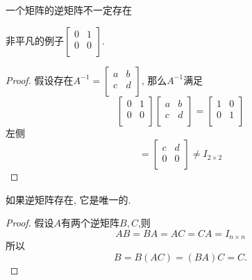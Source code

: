 \begin{proposition}
    一个矩阵的逆矩阵不一定存在
\end{proposition}
\begin{example}
    非平凡的例子$\begin{bmatrix}
     0 & 1\\
     0 & 0\\
    \end{bmatrix}$.
    \begin{proof}
        假设存在$A^{-1} = \begin{bmatrix}
            a & b\\
            c & d\\
           \end{bmatrix}$, 那么$A^{-1}$满足
           \begin{equation}
             \begin{bmatrix}
              0 & 1\\
              0 & 0\\
             \end{bmatrix}
             \begin{bmatrix}
              a & b\\
              c & d\\
             \end{bmatrix}
             =
             \begin{bmatrix}
              1 & 0\\
              0 & 1\\
             \end{bmatrix}
           \end{equation}
           左侧
           \begin{equation}
             = \begin{bmatrix}
              c & d\\
              0 & 0\\
             \end{bmatrix} \neq I_{2\times 2}
           \end{equation}
    \end{proof}
\end{example}

\begin{proposition}
    如果逆矩阵存在, 它是唯一的.
\end{proposition}
\begin{proof}
    假设$A$有两个逆矩阵$B,C$,则
    \begin{equation}
      AB = BA = AC = CA = I_{n \times n}
    \end{equation}
    所以
    \begin{equation}
      B = B(AC) = (BA)C = C.
    \end{equation}
\end{proof}

